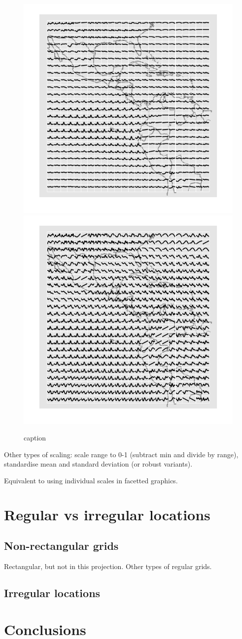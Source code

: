 \documentclass[oneside]{article}
\begin{document}
\begin{figure}[htbp]
  \centering
  \includegraphics[width=0.5\linewidth]{month-rescale-max}%
  \includegraphics[width=0.5\linewidth]{month-rescale01}
  \caption{caption}
  \label{fig:label}
\end{figure}

Other types of scaling: scale range to 0-1 (subtract min and divide by range), standardise mean and standard deviation (or robust variants). 

Equivalent to using individual scales in facetted graphics.


\section{Regular vs irregular locations}

\subsection{Non-rectangular grids}

Rectangular, but not in this projection.  Other types of regular grids.

\subsection{Irregular locations}

\section{Conclusions}


\end{document}
